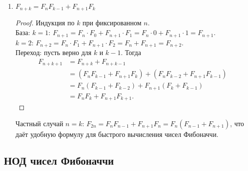 \documentclass[12pt]{article}
\begin{document}
\begin{enumerate}
		\begin{note}
			Матричная интерпретация: $\begin{pmatrix} F_{n+1} & F_n \\ F_n & F_{n-1} \end{pmatrix} = \begin{pmatrix} 1 & 1 \\ 1 & 0 \end{pmatrix}^n$. Тождество Кассини~--- это равенство определителей: $\det\begin{pmatrix} 1 & 1 \\ 1 & 0 \end{pmatrix}^n = \left(\det\begin{pmatrix} 1 & 1 \\ 1 & 0 \end{pmatrix}\right)^n = (-1)^n$.
		\end{note}
		
		\item $F_{n + k} = F_n F_{k - 1} + F_{n + 1} F_k$
		
		\begin{proof}
			Индукция по $k$ при фиксированном $n$. \\
			База: $k = 1$: $F_{n+1} = F_n \cdot F_0 + F_{n+1} \cdot F_1 = F_n \cdot 0 + F_{n+1} \cdot 1 = F_{n+1}$. \\
			$k = 2$: $F_{n+2} = F_n \cdot F_1 + F_{n+1} \cdot F_2 = F_n + F_{n+1} = F_{n+2}$. \\
			Переход: пусть верно для $k$ и $k-1$. Тогда
			\begin{align*}
				F_{n+k+1} &= F_{n+k} + F_{n+k-1} \\
				&= (F_n F_{k-1} + F_{n+1} F_k) + (F_n F_{k-2} + F_{n+1} F_{k-1}) \\
				&= F_n(F_{k-1} + F_{k-2}) + F_{n+1}(F_k + F_{k-1}) \\
				&= F_n F_k + F_{n+1} F_{k+1}.
			\end{align*}
		\end{proof}
		
		\begin{note}
			Частный случай $n = k$: $F_{2n} = F_n F_{n-1} + F_{n+1} F_n = F_n(F_{n-1} + F_{n+1})$, что даёт удобную формулу для быстрого вычисления чисел Фибоначчи.
		\end{note}
	\end{enumerate}
	
	\subsection{НОД чисел Фибоначчи}
	
\end{document}
